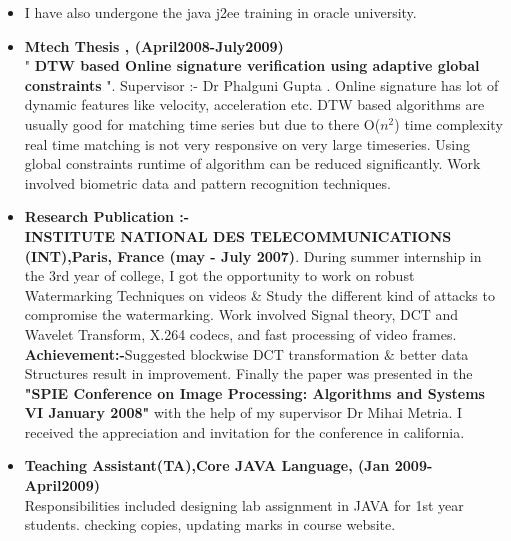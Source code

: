 \documentclass[]{res}
\makeatletter
\newcommand{\resitem}[1]{\item #1 \vspace{-2pt}}
\newcommand{\ressubheading}[4]{
\begin{tabular*}{6.5in}{l@{\extracolsep{\fill}}r}
		\textbf{#1} & #2 \\
		\textit{#3} & \textit{#4} \\
\end{tabular*}\vspace{-6pt}}
\makeatother
\begin{document}
\begin{description}
\begin{itemize}




\resitem{  I have also undergone the java j2ee training in oracle university. }   

\end {itemize}





\item[]
\begin{itemize}
	\item \textbf{Mtech Thesis     ,                                                                        (April2008-July2009) }\\
	" \textbf{DTW based Online signature verification using adaptive global constraints} ".  Supervisor :- Dr Phalguni Gupta .
Online signature has lot of dynamic features like velocity, acceleration etc. DTW based algorithms are usually good for matching time series but due to there O($n^2$) time complexity real time matching is not very responsive on very large timeseries. Using global constraints runtime of algorithm can be reduced significantly. Work involved biometric data and pattern recognition techniques.
\end{itemize}


\item[]
\begin{itemize}
	\item \textbf {Research Publication :-}\\
	 \textbf{INSTITUTE NATIONAL DES TELECOMMUNICATIONS (INT),Paris, France  (may - July 2007)}.  
	During summer internship in the 3rd year of college, I got the opportunity to work on robust Watermarking  Techniques on videos \& Study the different kind of attacks to compromise the watermarking. Work involved Signal theory, DCT and Wavelet Transform, X.264 codecs, and fast processing of video frames. \textbf{Achievement:-}Suggested blockwise DCT transformation \&  better data Structures result in improvement. Finally the paper was presented in the \textbf{"SPIE Conference on Image Processing: Algorithms and Systems VI January 2008"}  with the help of my supervisor Dr Mihai Metria. I received the appreciation and invitation for the conference in california. 
\end{itemize}

\item[]
\begin{itemize}
	\item  \textbf{Teaching Assistant(TA),Core JAVA Language, (Jan 2009-April2009)}\\
	Responsibilities included designing lab assignment in JAVA for 1st year students. checking copies, updating marks in course website.
\end{itemize}


\end{description}
\end{document}
